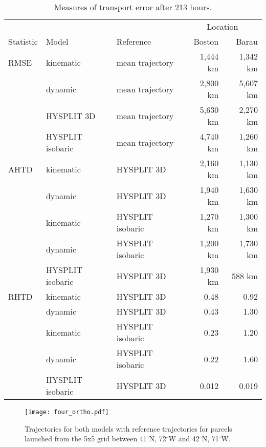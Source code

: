 \begin{table}
    \centering
    \caption{Measures of transport error after 213 hours.}    
    \begin{tabular}{ l l l r r }
        \hline
        \hline
        			&				&				& 	\multicolumn{2}{c}{Location} \\
	\cline{4-5}
        Statistic 	& Model 			& Reference 		& Boston 		& Barau		\\
        \hline
        RMSE	& kinematic 		& mean trajectory	& 1,444 km	& 1,342 km	\\
        		 	& dynamic 		& mean trajectory	& 2,800 km	& 5,607 km	\\
			& HYSPLIT 3D 		& mean trajectory	& 5,630 km	& 2,270 km	\\
        		 	& HYSPLIT isobaric 	& mean trajectory	& 4,740 km	& 1,260 km	\\
        AHTD 	& kinematic		& HYSPLIT 3D		& 2,160 km	& 1,130 km	\\
        		 	& dynamic			& HYSPLIT 3D 		& 1,940 km	& 1,630 km	\\
        		 	& kinematic		& HYSPLIT isobaric  & 1,270 km	& 1,300 km	\\
        		 	& dynamic			& HYSPLIT isobaric  & 1,200 km	& 1,730 km	\\
			& HYSPLIT isobaric	& HYSPLIT 3D 		& 1,930 km	& 588 km		\\
        RHTD 	& kinematic		& HYSPLIT 3D		& 0.48		& 0.92		\\
        		 	& dynamic			& HYSPLIT 3D 		& 0.43		& 1.30		\\
        		 	& kinematic		& HYSPLIT isobaric  & 0.23		& 1.20		\\
        		 	& dynamic			& HYSPLIT isobaric  & 0.22		& 1.60		\\
			& HYSPLIT isobaric	& HYSPLIT 3D 		& 0.012		& 0.019		\\	
        \hline
    \end{tabular}
\end{table}

\begin{figure}
    \centering
    \texttt{[image: four\_ortho.pdf]}
    \caption{Trajectories for both models with reference trajectories for parcels launched from the 5x5 grid between 41$^\circ$N, 72$^\circ$W and 42$^\circ$N, 71$^\circ$W. }
\end{figure}